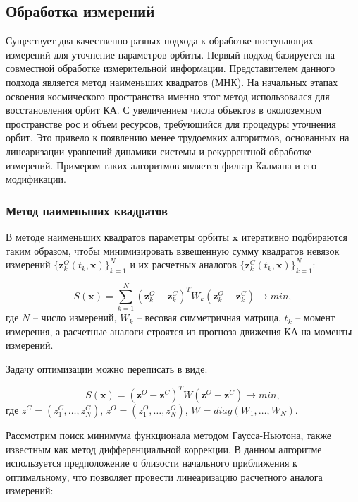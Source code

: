\subsection{Обработка измерений}
Существует два качественно разных подхода к обработке поступающих измерений
для уточнение параметров орбиты.
Первый подход базируется на совместной обработке измерительной информации. 
Представителем данного подхода является метод наименьших квадратов (МНК).
На начальных этапах освоения космического пространства именно этот метод использовался
для восстановления орбит КА. 
С увеличением числа объектов в околоземном пространстве рос и объем ресурсов, 
требующийся для процедуры уточнения орбит.
Это привело к появлению менее трудоемких алгоритмов, основанных 
на линеаризации уравнений динамики системы и рекуррентной обработке измерений. Примером таких
алгоритмов является фильтр Калмана и его модификации.

\subsubsection{Метод наименьших квадратов}
В методе наименьших квадратов параметры орбиты $\mathbf{x}$ итеративно 
подбираются таким образом,
чтобы минимизировать взвешенную сумму квадратов невязок измерений 
$\{\mathbf{z}^O_k (t_k, \mathbf{x})\}_{k=1}^N$ 
и их расчетных аналогов $\{\mathbf{z}_k^C (t_k, \mathbf{x})\}_{k=1}^N$:

\begin{equation}
    S(\mathbf{x}) = \sum_{k=1}^{N} (\mathbf{z}^O_k - \mathbf{z}^C_k)^T W_k 
    (\mathbf{z}^O_k - \mathbf{z}^C_k) \rightarrow min,
\end{equation}
где $N$ -- число измерений, $W_k$ -- весовая симметричная матрица, $t_k$ -- момент измерения, а
расчетные аналоги строятся из прогноза движения КА на моменты измерений.

Задачу оптимизации можно переписать в виде:

\begin{equation*}
    S(\mathbf{x}) = (\mathbf{z}^O - \mathbf{z}^C)^T W (\mathbf{z}^O - \mathbf{z}^C) \rightarrow min,
\end{equation*}
где $z^C = (z_1^C, \dots, z_N^C)$, $z^O = (z_1^O, \dots, z_N^O)$, $W = diag(W_1, \dots, W_N)$.

Рассмотрим поиск минимума функционала методом Гаусса-Ньютона, также
известным как метод дифференциальной коррекции. В данном алгоритме 
используется предположение о близости начального приближения к оптимальному, что позволяет
провести линеаризацию расчетного аналога измерений:

